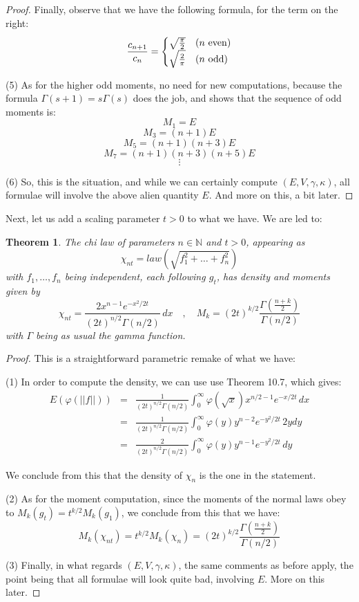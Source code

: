 \documentclass[12pt]{amsbook}
\newtheorem{theorem}{Theorem}[chapter]
\begin{document}
\begin{proof}
Finally, observe that we have the following formula, for the term on the right:
$$\frac{c_{n+1}}{c_n}=\begin{cases}
\sqrt{\frac{\pi}{2}}&(n\ {\rm even})\\
\sqrt{\frac{2}{\pi}}&(n\ {\rm odd})
\end{cases}$$

(5) As for the higher odd moments, no need for new computations, because the formula $\Gamma(s+1)=s\Gamma(s)$ does the job, and shows that the sequence of odd moments is:
$$M_1=E$$
$$M_3=(n+1)E$$
$$M_5=(n+1)(n+3)E$$
$$M_7=(n+1)(n+3)(n+5)E$$
$$\vdots$$

(6) So, this is the situation, and while we can certainly compute $(E,V,\gamma,\kappa)$, all formulae will involve the above alien quantity $E$. And more on this, a bit later.
\end{proof}

Next, let us add a scaling parameter $t>0$ to what we have. We are led to:

\begin{theorem}
The chi law of parameters $n\in\mathbb N$ and $t>0$, appearing as
$$\chi_{nt}=law\left(\sqrt{f_1^2+\ldots+f_n^2}\right)$$
with $f_1,\ldots,f_n$ being independent, each following $g_t$, has density and moments given by
$$\chi_{nt}=\frac{2x^{n-1}e^{-x^2/2t}}{(2t)^{n/2}\Gamma(n/2)}\,dx
\quad,\quad 
M_k=(2t)^{k/2}\frac{\Gamma\left(\frac{n+k}{2}\right)}{\Gamma(n/2)}$$
with $\Gamma$ being as usual the gamma function.
\end{theorem}

\begin{proof}
This is a straightforward parametric remake of what we have:

\medskip

(1) In order to compute the density, we can use use Theorem 10.7, which gives:
\begin{eqnarray*}
E(\varphi(||f||))
&=&\frac{1}{(2t)^{n/2}\Gamma(n/2)}\int_0^\infty\varphi(\sqrt{x})x^{n/2-1}e^{-x/2t}\,dx\\
&=&\frac{1}{(2t)^{n/2}\Gamma(n/2)}\int_0^\infty\varphi(y)y^{n-2}e^{-y^2/2t}\,2ydy\\
&=&\frac{2}{(2t)^{n/2}\Gamma(n/2)}\int_0^\infty\varphi(y)y^{n-1}e^{-y^2/2t}\,dy
\end{eqnarray*}

We conclude from this that the density of $\chi_n$ is the one in the statement.

\medskip

(2) As for the moment computation, since the moments of the normal laws obey to $M_k(g_t)=t^{k/2}M_k(g_1)$, we conclude from this that we have:
$$M_k(\chi_{nt})=t^{k/2}M_k(\chi_n)=(2t)^{k/2}\frac{\Gamma\left(\frac{n+k}{2}\right)}{\Gamma(n/2)}$$

(3) Finally, in what regards $(E,V,\gamma,\kappa)$, the same comments as before apply, the point being that all formulae will look quite bad, involving $E$. More on this later.
\end{proof}
\end{document}
